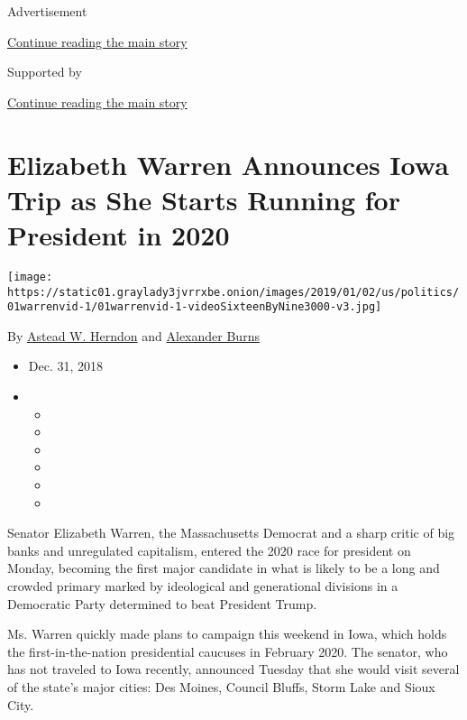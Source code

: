 Advertisement

\protect\hyperlink{after-top}{Continue reading the main story}

Supported by

\protect\hyperlink{after-sponsor}{Continue reading the main story}

\hypertarget{elizabeth-warren-announces-iowa-trip-as-she-starts-running-for-president-in-2020}{%
\section{Elizabeth Warren Announces Iowa Trip as She Starts Running for
President in
2020}\label{elizabeth-warren-announces-iowa-trip-as-she-starts-running-for-president-in-2020}}

\texttt{[image: https://static01.graylady3jvrrxbe.onion/images/2019/01/02/us/politics/01warrenvid-1/01warrenvid-1-videoSixteenByNine3000-v3.jpg]}

By \href{https://www.nytimes3xbfgragh.onion/by/astead-w-herndon}{Astead
W. Herndon} and
\href{https://www.nytimes3xbfgragh.onion/by/alexander-burns}{Alexander
Burns}

\begin{itemize}
\item
  Dec. 31, 2018
\item
  \begin{itemize}
  \item
  \item
  \item
  \item
  \item
  \item
  \end{itemize}
\end{itemize}

Senator Elizabeth Warren, the Massachusetts Democrat and a sharp critic
of big banks and unregulated capitalism, entered the 2020 race for
president on Monday, becoming the first major candidate in what is
likely to be a long and crowded primary marked by ideological and
generational divisions in a Democratic Party determined to beat
President Trump.

Ms. Warren quickly made plans to campaign this weekend in Iowa, which
holds the first-in-the-nation presidential caucuses in February 2020.
The senator, who has not traveled to Iowa recently, announced Tuesday
that she would visit several of the state's major cities: Des Moines,
Council Bluffs, Storm Lake and Sioux City.

